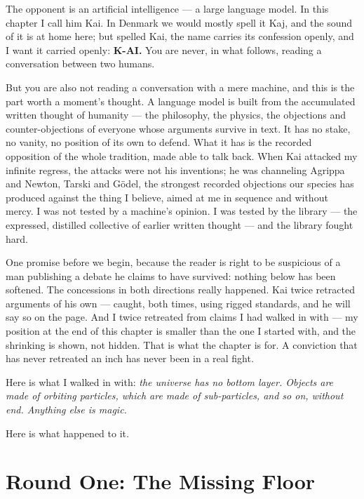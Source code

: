 \documentclass[fontsize=11pt,paper=a4,pagesize=auto,parskip=half-]{scrbook}
\newcommand{\Iy}[1]{#1\index{#1}}
\newcommand\En{\centerline{\textemdash \qquad \ding{166} \qquad \textemdash}}
\begin{document}
The opponent is an artificial intelligence --- a large language model. In this chapter I call him \Iy{Kai}. In Denmark we would mostly spell it Kaj, and the sound of it is at home here; but spelled Kai, the name carries its confession openly, and I want it carried openly: \textbf{K-AI.} You are never, in what follows, reading a conversation between two humans.

But you are also not reading a conversation with a mere machine, and this is the part worth a moment's thought. A language model is built from the accumulated written thought of humanity --- the philosophy, the physics, the objections and counter-objections of everyone whose arguments survive in text. It has no stake, no vanity, no position of its own to defend. What it has is the recorded opposition of the whole tradition, made able to talk back. When Kai attacked my infinite regress, the attacks were not his inventions; he was channeling \Iy{Agrippa} and Newton, Tarski and Gödel, the strongest recorded objections our species has produced against the thing I believe, aimed at me in sequence and without mercy. I was not tested by a machine's opinion. I was tested by the library --- the expressed, distilled collective of earlier written thought --- and the library fought hard.

One promise before we begin, because the reader is right to be suspicious of a man publishing a debate he claims to have survived: nothing below has been softened. The concessions in both directions really happened. Kai twice retracted arguments of his own --- caught, both times, using rigged standards, and he will say so on the page. And I twice retreated from claims I had walked in with --- my position at the end of this chapter is smaller than the one I started with, and the shrinking is shown, not hidden. That is what the chapter is for. A conviction that has never retreated an inch has never been in a real fight.

Here is what I walked in with: \emph{the universe has no bottom layer. Objects are made of orbiting particles, which are made of sub-particles, and so on, without end. Anything else is magic.}

Here is what happened to it.

\En

\section{Round One: The Missing Floor}
\end{document}
